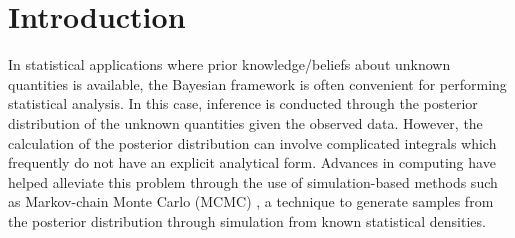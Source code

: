 \documentclass[useAMS,referee,usenatbib]{biom}
\begin{document}

%

\fontsize{10}{12}\selectfont

\section{Introduction \label{sec:intro}}

In statistical applications where prior knowledge/beliefs about unknown quantities is available, the Bayesian framework is often convenient for performing statistical analysis.  In this case, inference is conducted through the posterior distribution of the unknown quantities given the observed data.  However, the calculation of the posterior distribution can involve complicated integrals which frequently do not have an explicit analytical form.  Advances in computing have helped alleviate this problem through the use of simulation-based methods such as Markov-chain Monte Carlo (MCMC) \citep{Gelf:Smit:samp:1990}, a technique to generate samples from the posterior distribution through simulation from known statistical densities.
\end{document}
